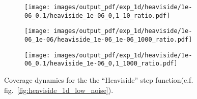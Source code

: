 \documentclass[a4paper,14pt]{extarticle}
\begin{document}
\begin{figure}
\begin{subfigure}[b]{0.25\linewidth}
    \caption{} \label{fig:heaviside_1d_low_noise_arb_c1}
  \end{subfigure}%
  \begin{subfigure}[b]{0.25\linewidth}
    \texttt{[image: images/output\_pdf/exp\_1d/heaviside/1e-06\_0.1/heaviside\_1e-06\_0,1\_10\_ratio.pdf]}
    \caption{} \label{fig:heaviside_1d_low_noise_arb_c2}
  \end{subfigure}%
  \begin{subfigure}[b]{0.25\linewidth}
    \texttt{[image: images/output\_pdf/exp\_1d/heaviside/1e-06\_1e-06/heaviside\_1e-06\_1e-06\_1000\_ratio.pdf]}
    \caption{} \label{fig:heaviside_1d_low_noise_arb_c3}
  \end{subfigure}%
  \begin{subfigure}[b]{0.25\linewidth}
    \texttt{[image: images/output\_pdf/exp\_1d/heaviside/1e-06\_0.1/heaviside\_1e-06\_0,1\_1000\_ratio.pdf]}
    \caption{} \label{fig:heaviside_1d_low_noise_arb_c4}
  \end{subfigure}%
  \caption{Coverage dynamics for the the ``Heaviside'' step function(c.f. fig.~\ref{fig:heaviside_1d_low_noise}).}
  \label{fig:heaviside_1d_low_noise_arb}
\end{figure}
\end{document}
